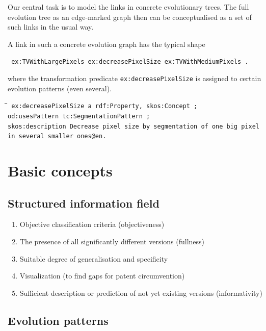 \documentclass[11pt,a4paper]{article}
\newenvironment{code}{\tt \begin{tabbing}
\hskip12pt\=\hskip12pt\=\hskip12pt\=\hskip12pt\=\hskip5cm\=\hskip5cm\=\kill}
{\end{tabbing}}
\def\dq{{\char34}}
\begin{document}
Our central task is to model the links in concrete evolutionary trees. The
full evolution tree as an edge-marked graph then can be conceptualised as a
set of such links in the usual way.

A link in such a concrete evolution graph has the typical shape
\begin{center}\tt
  ex:TVWithLargePixels ex:decreasePixelSize ex:TVWithMediumPixels .
\end{center}
where the transformation predicate \texttt{ex:decreasePixelSize} is assigned
to certain evolution patterns (even several).
\begin{code}\tt
  ex:decreasePixelSize a rdf:Property, skos:Concept ;\\
  \> od:usesPattern tc:SegmentationPattern ;\\
  \> skos:description {\dq}{\dq}{\dq}Decrease pixel size by segmentation of
  one big pixel\\\>\> in several smaller ones{\dq}{\dq}{\dq}@en. 
\end{code}

\section{Basic concepts}

\subsection{Structured information field}

\begin{enumerate}
    \item Objective classification criteria (objectiveness)
    \item The presence of all significantly different versions (fullness)
    \item Suitable degree of generalisation and specificity
    \item Visualization (to find gaps for patent circumvention)
    \item Sufficient description or prediction of not yet existing versions (informativity)
\end{enumerate}

\subsection{Evolution patterns}
\end{document}
